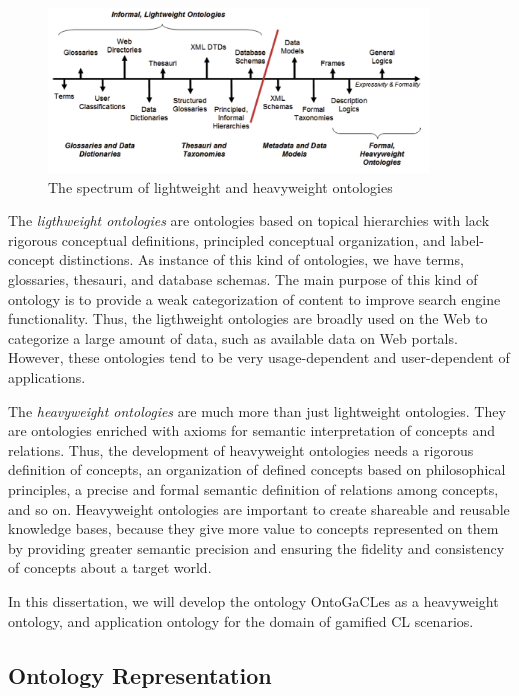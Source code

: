 \begin{figure}[htb]
 \caption{The spectrum of lightweight and heavyweight ontologies}
 \label{fig:spectrum-ontologies}
 \centering
 \includegraphics[width=0.9\textwidth]{images/chap-general-background/spectrum-ontologies.png}
\end{figure}

The \emph{ligthweight ontologies} are ontologies based on topical hierarchies with lack rigorous conceptual definitions, principled conceptual organization, and label-concept distinctions. As instance of this kind of ontologies, we have terms, glossaries, thesauri, and database schemas. The main purpose of this kind of ontology is to provide a weak categorization of content to improve search engine functionality. Thus, the ligthweight ontologies are broadly used on the Web to categorize a large amount of data, such as available data on Web portals. However, these ontologies tend to be very usage-dependent and user-dependent of applications.

The \emph{heavyweight ontologies} are much more than just lightweight ontologies. They are ontologies enriched with axioms for semantic interpretation of concepts and relations. Thus, the development of heavyweight ontologies needs a rigorous definition of concepts, an organization of defined concepts based on philosophical principles, a precise and formal semantic definition of relations among concepts, and so on. Heavyweight ontologies are important to create shareable and reusable knowledge bases, because they give more value to concepts represented on them by providing greater semantic precision and ensuring the fidelity and consistency of concepts about a target world.

In this dissertation, we will develop the ontology OntoGaCLes as a heavyweight ontology, and application ontology for the domain of gamified CL scenarios.

\subsection{Ontology Representation}
\label{subsec:ontology-representation}

